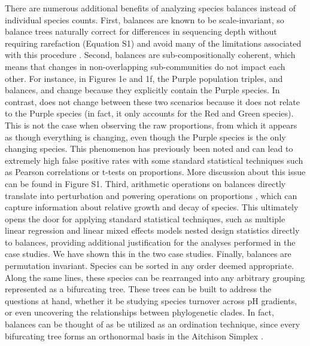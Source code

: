 There are numerous additional benefits of analyzing species balances instead of individual species counts.  First, balances are known to be scale-invariant, so balance trees naturally correct for differences in sequencing depth without requiring rarefaction (Equation S1) and avoid many of the limitations associated with this procedure \cite{waste_not}. Second, balances are sub-compositionally coherent, which means that changes in non-overlapping sub-communities do not impact each other.  For instance, in Figures 1e and 1f, the Purple population triples, and balances, and change because they explicitly contain the Purple species.  In contrast, does not change between these two scenarios because it does not relate to the Purple species (in fact, it only accounts for the Red and Green species).  This is not the case when observing the raw proportions, from which it appears as though everything is changing, even though the Purple species is the only changing species.  This phenomenon has previously been noted \cite{ancom} and can lead to extremely high false positive rates with some standard statistical techniques such as Pearson correlations or t-tests on proportions.  More discussion about this issue can be found in Figure S1. Third, arithmetic operations on balances directly translate into perturbation and powering operations on proportions \cite{ilr} \cite{Pawlowsky-Glahn2015-qb}, which can capture information about relative growth and decay of species.  This ultimately opens the door for applying standard statistical techniques, such as multiple linear regression \cite{c24} and linear mixed effects models nested design statistics directly to balances, providing additional justification for the analyses performed in the case studies.  We have shown this in the two case studies.  Finally, balances are permutation invariant.  Species can be sorted in any order deemed appropriate.  Along the same lines, these species can be rearranged into any arbitrary grouping represented as a bifurcating tree.  These trees can be built to address the questions at hand, whether it be studying species turnover across pH gradients, or even uncovering the relationships between phylogenetic clades.  In fact, balances can be thought of as be utilized as an ordination technique, since every bifurcating tree forms an orthonormal basis in the Aitchison Simplex \cite{groups_of_parts}.\par
